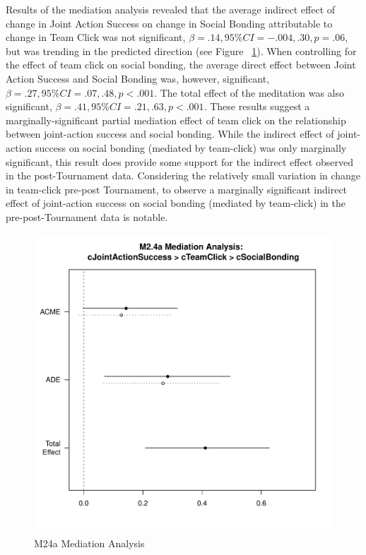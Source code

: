 \documentclass[12pt]{report}
\begin{document}
{Results of the mediation analysis revealed that the average indirect effect of change in Joint Action Success on change in Social Bonding attributable to change in Team Click was not significant, $\beta = .14, 95\% CI = -.004 , .30, p = .06$, but was trending in the predicted direction (see Figure ~\ref{fig:MLM24aMediationAnalysis}).  When controlling for the effect of team click on social bonding, the average direct effect between Joint Action Success and Social Bonding was, however, significant, $\beta = .27, 95\% CI = .07 , .48, p < .001$.  The total effect of the meditation was also significant, $\beta = .41, 95\% CI = .21 , .63, p < .001$.  These results suggest a marginally-significant partial mediation effect of team click on the relationship between joint-action success and social bonding.  While the indirect effect of joint-action success on social bonding (mediated by team-click) was only marginally significant, this result does provide some support for the indirect effect observed in the post-Tournament data.  Considering the relatively small variation in change in team-click pre-post Tournament, to observe a marginally significant indirect effect of joint-action success on social bonding (mediated by team-click) in the pre-post-Tournament data is notable.


\begin{figure}[htbp]
  \centering
  \includegraphics[width=\columnwidth]{../images/MLM24aMediationAnalysis.pdf}
  \caption{M24a Mediation Analysis}
  \label{fig:MLM24aMediationAnalysis}
\end{figure}



}
\end{document}
